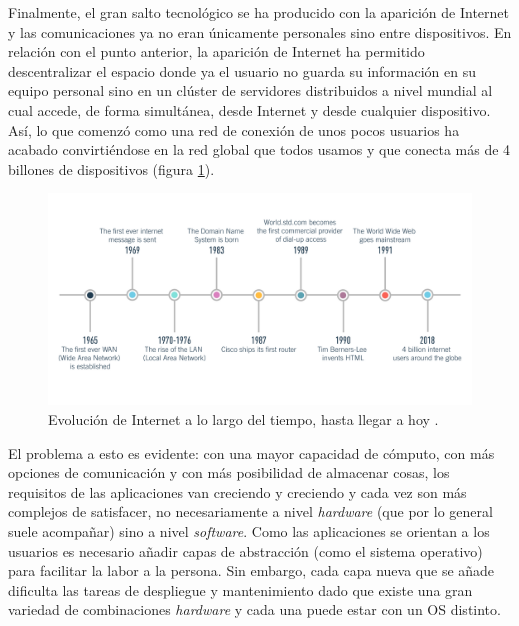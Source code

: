 Finalmente, el gran salto tecnológico se ha producido con la aparición de Internet y
las comunicaciones ya no eran únicamente personales sino entre dispositivos. En relación
con el punto anterior, la aparición de Internet ha permitido descentralizar el espacio
donde ya el usuario no guarda su información en su equipo personal sino en un clúster
de servidores distribuidos a nivel mundial al cual accede, de forma simultánea,
desde Internet y desde cualquier dispositivo. Así, lo que comenzó como una red de
conexión de unos pocos usuarios ha acabado convirtiéndose en la red global que
todos usamos y que conecta más de 4 billones de dispositivos (figura \ref{fig:internet-evo}).

\begin{figure}[H]
    \centering
    \includegraphics[width=.9\linewidth]{pictures/internet-timeline.png}
    \caption{Evolución de Internet a lo largo del tiempo, hasta llegar a hoy \cite{HowBecomeWeb}.}
    \label{fig:internet-evo}
\end{figure}

El problema a esto es evidente: con una mayor capacidad de cómputo, con más opciones
de comunicación y con más posibilidad de almacenar cosas, los requisitos de las
aplicaciones van creciendo y creciendo y cada vez son más complejos de satisfacer,
no necesariamente a nivel \textit{hardware} (que por lo general suele acompañar)
sino a nivel \textit{software}. Como las aplicaciones se orientan a los usuarios
es necesario añadir capas de abstracción (como el sistema operativo) para facilitar
la labor a la persona. Sin embargo, cada capa nueva que se añade dificulta las tareas
de despliegue y mantenimiento dado que existe una gran variedad de combinaciones
\textit{hardware} y cada una puede estar con un OS distinto.